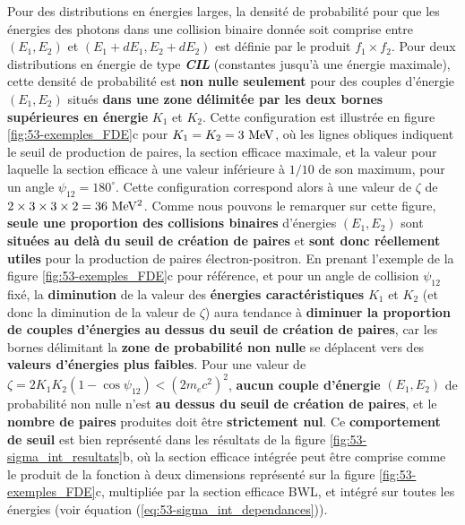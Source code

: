 \begin{refsection}
Pour des distributions en énergies larges, la densité de probabilité pour que les énergies des photons dans une collision binaire donnée soit comprise entre $(E_1,E_2)$ et $(E_1+dE_1, E_2+dE_2)$ est définie par le produit $f_1 \times f_2$. Pour deux distributions en énergie de type \textbf{\textit{CIL}} (constantes jusqu'à une énergie maximale), cette densité de probabilité est \textbf{non nulle seulement} pour des couples d'énergie $(E_1, E_2)$ situés \textbf{dans une zone délimitée par les deux bornes supérieures en énergie} $K_1$ et $K_2$. Cette configuration est illustrée en figure \ref{fig:53-exemples_FDE}c pour $K_1=K_2=3 ~ \rm MeV$, où les lignes obliques indiquent le seuil de production de paires, la section efficace maximale, et la valeur pour laquelle la section efficace à une valeur inférieure à $1/10$ de son maximum, pour un angle $\psi_{12}=180^\circ$. Cette configuration correspond alors à une valeur de $\zeta$ de $2 \times 3 \times 3 \times 2 = 36 ~ \rm MeV^2$. Comme nous pouvons le remarquer sur cette figure, \textbf{seule une proportion des collisions binaires} d'énergies $(E_1,E_2)$ sont \textbf{situées au delà du seuil de création de paires} et \textbf{sont donc réellement utiles} pour la production de paires électron-positron. 
En prenant l'exemple de la figure \ref{fig:53-exemples_FDE}c pour référence, et pour un angle de collision $\psi_{12}$ fixé, la \textbf{diminution} de la valeur des \textbf{énergies caractéristiques} $K_1$ et $K_2$ (et donc la diminution de la valeur de $\zeta$) aura tendance à \textbf{diminuer la proportion de couples d'énergies au dessus du seuil de création de paires}, car les bornes délimitant la \textbf{zone de probabilité non nulle} se déplacent vers des \textbf{valeurs d'énergies plus faibles}. Pour une valeur de $\zeta=2K_1 K_2 (1- \cos{\psi_{12}})< (2 m_e c^2)^2$, \textbf{aucun couple d'énergie} $(E_1,E_2)$ de probabilité non nulle n'est \textbf{au dessus du seuil de création de paires}, et le \textbf{nombre de paires} produites doit être \textbf{strictement nul}. Ce \textbf{comportement de seuil} est bien représenté dans les résultats de la figure \ref{fig:53-sigma_int_resultats}b, où la section efficace intégrée peut être comprise comme le produit de la fonction à deux dimensions représenté sur la figure \ref{fig:53-exemples_FDE}c, multipliée par la section efficace BWL, et intégré sur toutes les énergies (voir équation (\ref{eq:53-sigma_int_dependances})). 

\end{refsection}
